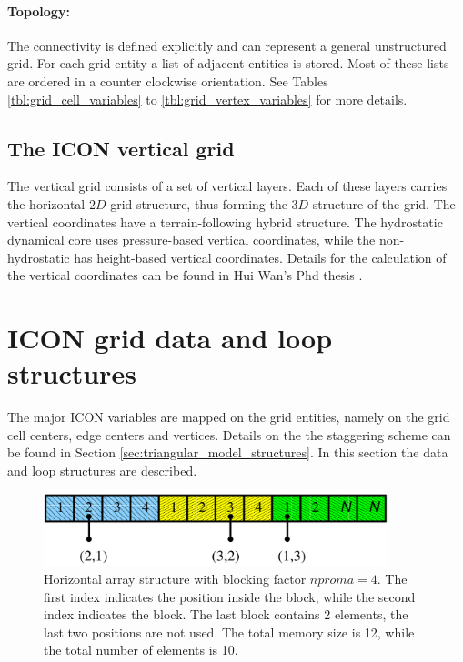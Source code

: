 \documentclass[a4paper,11pt,DIV16,BCOR1cm,titlepage]{scrartcl}
\begin{document}
\paragraph{Topology:} The connectivity is defined explicitly and can represent a general
unstructured grid.
For each grid entity a list of adjacent entities is stored. Most of these lists are ordered 
in a counter clockwise orientation. See Tables \ref{tbl:grid_cell_variables} to 
\ref{tbl:grid_vertex_variables} for more details.



\subsection{The ICON vertical grid}
\label{sec:icon_vertical_spherical_grid}

The vertical grid consists of a set of vertical layers.
Each of these layers carries the horizontal $2D$ grid 
structure, thus forming the $3D$ structure of the grid. 
The vertical coordinates have a terrain-following hybrid structure.
The hydrostatic dynamical core uses pressure-based vertical coordinates,
while the non-hydrostatic has height-based  vertical coordinates.
Details for the calculation of the vertical coordinates can be found in 
Hui Wan's Phd thesis \cite{HuiWanPhD}.


\section{ICON grid data and loop structures}
\label{sec:data_loop_structures}


The major ICON variables are mapped on the grid entities, 
namely on the grid cell centers, edge centers and vertices. 
Details on the the staggering scheme can be found in Section 
\ref{sec:triangular_model_structures}. 
In this section the data and loop structures are described.

\begin{figure}[!htd]
  \begin{center}
    \includegraphics[width=10.0cm,draft=false]{../contrib/nproma_1.pdf}
  \end{center}
  \caption{Horizontal array structure with blocking factor $nproma=4$.
  The first index indicates the position inside the block, while the second index
  indicates the block. The last block contains 2 elements, the last two positions are 
  not used. The total memory size is 12, while the total number of elements is 10.}
  \label{fig:nproma_1}
\end{figure}
\end{document}
